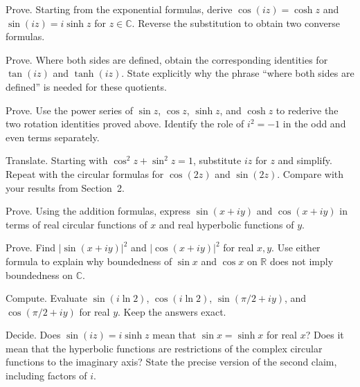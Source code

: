 \documentclass{workbook}
\newcommand{\R}{\mathbb{R}}
\newcommand{\C}{\mathbb{C}}
\begin{document}
\begin{problem}{Prove.}
Starting from the exponential formulas, derive
$\cos(iz)=\cosh z$ and $\sin(iz)=i\sinh z$ for $z\in\C$.
Reverse the substitution to obtain two converse formulas.
\end{problem}

\begin{problem}{Prove.}
Where both sides are defined, obtain the corresponding identities for
$\tan(iz)$ and $\tanh(iz)$. State explicitly why the phrase ``where
both sides are defined'' is needed for these quotients.
\end{problem}

\begin{problem}{Prove.}
Use the power series of $\sin z$, $\cos z$, $\sinh z$, and $\cosh z$
to rederive the two rotation identities proved above. Identify the role of
$i^2=-1$ in the odd and even terms separately.
\end{problem}

\begin{problem}{Translate.}
Starting with $\cos^2z+\sin^2z=1$, substitute $iz$ for $z$ and
simplify. Repeat with the circular formulas for $\cos(2z)$ and
$\sin(2z)$. Compare with your results from Section~2.
\end{problem}

\begin{problem}{Prove.}
Using the addition formulas, express $\sin(x+iy)$ and $\cos(x+iy)$
in terms of real circular functions of $x$ and real hyperbolic functions
of $y$.
\end{problem}

\begin{problem}{Prove.}
Find $|\sin(x+iy)|^2$ and $|\cos(x+iy)|^2$ for real $x,y$.
Use either formula to explain why boundedness of $\sin x$ and $\cos x$
on $\R$ does not imply boundedness on $\C$.
\end{problem}

\begin{problem}{Compute.}
Evaluate $\sin(i\ln2)$, $\cos(i\ln2)$,
$\sin(\pi/2+iy)$, and $\cos(\pi/2+iy)$ for real $y$.
Keep the answers exact.
\end{problem}

\begin{problem}{Decide.}
Does $\sin(iz)=i\sinh z$ mean that $\sin x=\sinh x$ for real $x$?
Does it mean that the hyperbolic functions are restrictions of the
complex circular functions to the imaginary axis? State the precise
version of the second claim, including factors of $i$.
\end{problem}
\end{document}
